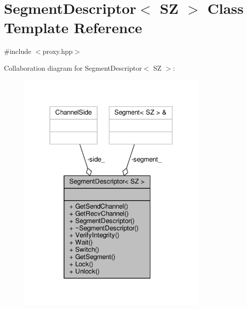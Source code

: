 \hypertarget{classSegmentDescriptor}{}\section{Segment\+Descriptor$<$ SZ $>$ Class Template Reference}
\label{classSegmentDescriptor}


{\ttfamily \#include $<$proxy.\+hpp$>$}



Collaboration diagram for Segment\+Descriptor$<$ SZ $>$\+:
\nopagebreak
\begin{figure}[H]
\begin{center}
\leavevmode
\includegraphics[width=266pt]{classSegmentDescriptor__coll__graph}
\end{center}
\end{figure}

